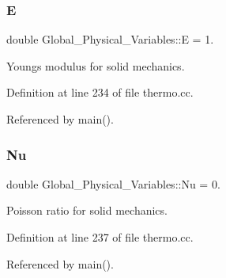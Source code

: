 \mbox{\label{namespaceGlobal__Physical__Variables_a09a019474b7405b35da2437f7779bc7e}} 
\subsubsection{\texorpdfstring{E}{E}}
{\footnotesize\ttfamily double Global\+\_\+\+Physical\+\_\+\+Variables\+::E = 1.}



Young\textquotesingle{}s modulus for solid mechanics. 



Definition at line 234 of file thermo.\+cc.



Referenced by main().

\mbox{\label{namespaceGlobal__Physical__Variables_a3962c36313826b19f216f6bbbdd6a477}} 
\subsubsection{\texorpdfstring{Nu}{Nu}}
{\footnotesize\ttfamily double Global\+\_\+\+Physical\+\_\+\+Variables\+::\+Nu = 0.}



Poisson ratio for solid mechanics. 



Definition at line 237 of file thermo.\+cc.



Referenced by main().

